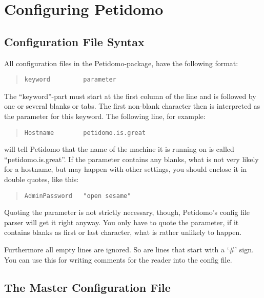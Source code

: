 \documentclass[a4paper,11pt]{scrreprt}
\begin{document}
\chapter{Configuring Petidomo}

\section{Configuration File Syntax}

All configuration files in the Petidomo-package\label{Config file
format}, have the following format:
\begin{quote}
\begin{verbatim}
keyword         parameter
\end{verbatim}
\end{quote}

The ``keyword''-part must start at the first column of the line and is
followed by one or several blanks or tabs. The first non-blank
character then is interpreted as the parameter for this keyword. The
following line, for example:
\begin{quote}
\begin{verbatim}
Hostname        petidomo.is.great
\end{verbatim}
\end{quote}
will tell Petidomo that the name of the machine it is running on is
called ``petidomo.is.great''. If the parameter contains any blanks,
what is not very likely for a hostname, but may happen with other
settings, you should enclose it in double quotes, like this:
\begin{quote}
\begin{verbatim}
AdminPassword   "open sesame"
\end{verbatim}
\end{quote}

Quoting the parameter is not strictly necessary, though, Petidomo's
config file parser will get it right anyway. You only have to quote
the parameter, if it contains blanks as first or last character, what
is rather unlikely to happen.

Furthermore all empty lines are ignored. So are lines that start with
a `\#' sign. You can use this for writing comments for the reader into
the config file.

\section{The Master Configuration File}
\label{master config file}
\end{document}
